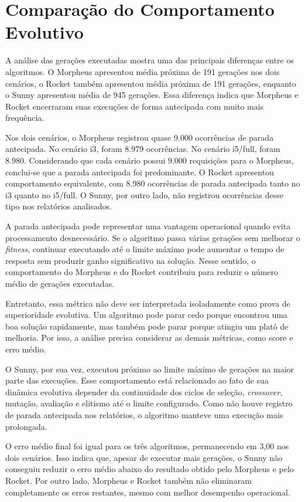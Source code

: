 \section{Comparação do Comportamento Evolutivo}
\label{sec:comportamento-evolutivo}

A análise das gerações executadas mostra uma das principais diferenças entre os algoritmos. O Morpheus apresentou média próxima de 191 gerações nos dois cenários, o Rocket também apresentou média próxima de 191 gerações, enquanto o Sunny apresentou média de 945 gerações. Essa diferença indica que Morpheus e Rocket encerraram suas execuções de forma antecipada com muito mais frequência.

Nos dois cenários, o Morpheus registrou quase 9.000 ocorrências de parada antecipada. No cenário i3, foram 8.979 ocorrências. No cenário i5/full, foram 8.980. Considerando que cada cenário possui 9.000 requisições para o Morpheus, conclui-se que a parada antecipada foi predominante. O Rocket apresentou comportamento equivalente, com 8.980 ocorrências de parada antecipada tanto no i3 quanto no i5/full. O Sunny, por outro lado, não registrou ocorrências desse tipo nos relatórios analisados.

A parada antecipada pode representar uma vantagem operacional quando evita processamento desnecessário. Se o algoritmo passa várias gerações sem melhorar o \textit{fitness}, continuar executando até o limite máximo pode aumentar o tempo de resposta sem produzir ganho significativo na solução. Nesse sentido, o comportamento do Morpheus e do Rocket contribuiu para reduzir o número médio de gerações executadas.

Entretanto, essa métrica não deve ser interpretada isoladamente como prova de superioridade evolutiva. Um algoritmo pode parar cedo porque encontrou uma boa solução rapidamente, mas também pode parar porque atingiu um platô de melhoria. Por isso, a análise precisa considerar as demais métricas, como score e erro médio.

O Sunny, por sua vez, executou próximo ao limite máximo de gerações na maior parte das execuções. Esse comportamento está relacionado ao fato de sua dinâmica evolutiva depender da continuidade dos ciclos de seleção, \textit{crossover}, mutação, avaliação e elitismo até o limite configurado. Como não houve registro de parada antecipada nos relatórios, o algoritmo manteve uma execução mais prolongada.

O erro médio final foi igual para os três algoritmos, permanecendo em 3,00 nos dois cenários. Isso indica que, apesar de executar mais gerações, o Sunny não conseguiu reduzir o erro médio abaixo do resultado obtido pelo Morpheus e pelo Rocket. Por outro lado, Morpheus e Rocket também não eliminaram completamente os erros restantes, mesmo com melhor desempenho operacional.

